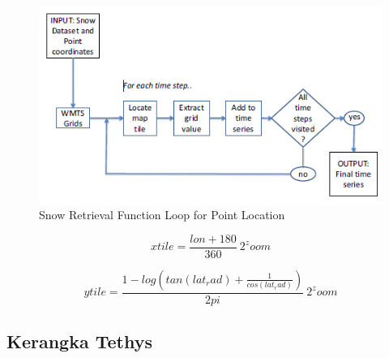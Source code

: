 \begin{figure}[ht]

\centerline{\includegraphics[width=1\textwidth]{figures/figures1_wmts.png}}

\caption{Snow Retrieval Function Loop for Point Location}

\label{figures1_wmts}

\end{figure}

\begin{equation}
	    xtile = \frac{lon + 180}{360} \ 2^zoom 
\end{equation}

\begin{equation}
	    ytile =\frac{1-log (tan(lat_rad) + \frac{1}{cos(lat_rad)})}{2pi} \ 2^zoom 
\end{equation}



\subsection{Kerangka Tethys}

